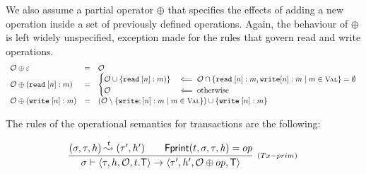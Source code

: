 \documentclass[a4paper,UKenglish]{article}%
\theoremstyle{plain}
\begin{document}
We also assume a partial operator $\oplus$ that specifies the effects of adding a new operation inside 
a set of previously defined operations. Again, the behaviour of $\oplus$ is left widely unspecified, 
exception made for the rules that govern read and write operations.
\[
\begin{array}{lcl}
\mathcal{O} \oplus \varepsilon &=& \mathcal{O}\\
\mathcal{O} \oplus (\RD\;[n]: m) &=&
\begin{cases}
\mathcal{O} \cup \{\RD\; [n]: m)\} & \impliedby \mathcal{O} \cap \{ \RD\;[n]: m, \WR [n]: m \mid m \in \Val\} = \emptyset\\
\mathcal{O} & \impliedby \text{otherwise}
\end{cases}\\
\mathcal{O} \oplus (\WR\;[n]: m) &=& 
(\mathcal{O} \setminus \{ \WR;[n] : m \mid m \in \Val \}) \cup \{\WR\;[n]: m \}
\end{array}
\]

The rules of the operational semantics for transactions are the following: 

\[
\infer[{\scriptstyle{(Tx-prim)}}]
{\thdstack \vdash \langle \txstack, \heap, \mathcal{O}, t.\trans  \rangle \rightarrow \langle \txstack', \heap', \mathcal{O} \oplus op, \trans \rangle}
{(\thdstack, \txstack, \heap) \toT{t} (\txstack', \heap') \qquad \fingerprint(t,\thdstack,\txstack,\h) = op}
\]

\end{document}
